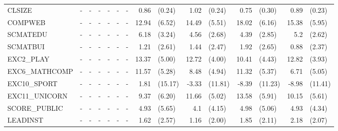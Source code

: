 \documentclass[10pt]{article}
\begin{document}
\begin{table}[htbp]
\begin{tabular}{lrlrlrlrlrlrlrl}
 CLSIZE & \multicolumn{1}{c}{-} & \multicolumn{1}{c}{-} & \multicolumn{1}{c}{-} & \multicolumn{1}{c}{-} & \multicolumn{1}{c}{-} & \multicolumn{1}{c}{-} & 0.86  & (0.24) & 1.02  & (0.24) & 0.75  & (0.30) & 0.89  & (0.23) \\[0.2em]
 COMPWEB & \multicolumn{1}{c}{-} & \multicolumn{1}{c}{-} & \multicolumn{1}{c}{-} & \multicolumn{1}{c}{-} & \multicolumn{1}{c}{-} & \multicolumn{1}{c}{-} & 12.94 & (6.52) & 14.49 & (5.51) & 18.02 & (6.16) & 15.38 & (5.95) \\[0.2em]
 SCMATEDU & \multicolumn{1}{c}{-} & \multicolumn{1}{c}{-} & \multicolumn{1}{c}{-} & \multicolumn{1}{c}{-} & \multicolumn{1}{c}{-} & \multicolumn{1}{c}{-} & 6.18  & (3.24) & 4.56  & (2.68) & 4.39  & (2.85) & 5.2   & (2.62) \\[0.2em]
 SCMATBUI & \multicolumn{1}{c}{-} & \multicolumn{1}{c}{-} & \multicolumn{1}{c}{-} & \multicolumn{1}{c}{-} & \multicolumn{1}{c}{-} & \multicolumn{1}{c}{-} & 1.21  & (2.61) & 1.44  & (2.47) & 1.92  & (2.65) & 0.88  & (2.37) \\[0.2em]
 EXC2\_PLAY & \multicolumn{1}{c}{-} & \multicolumn{1}{c}{-} & \multicolumn{1}{c}{-} & \multicolumn{1}{c}{-} & \multicolumn{1}{c}{-} & \multicolumn{1}{c}{-} & 13.37 & (5.00) & 12.72 & (4.00) & 10.41 & (4.43) & 12.82 & (3.93) \\[0.2em]
 EXC6\_MATHCOMP & \multicolumn{1}{c}{-} & \multicolumn{1}{c}{-} & \multicolumn{1}{c}{-} & \multicolumn{1}{c}{-} & \multicolumn{1}{c}{-} & \multicolumn{1}{c}{-} & 11.57 & (5.28) & 8.48  & (4.94) & 11.32 & (5.37) & 6.71  & (5.05) \\[0.2em]
 EXC10\_SPORT & \multicolumn{1}{c}{-} & \multicolumn{1}{c}{-} & \multicolumn{1}{c}{-} & \multicolumn{1}{c}{-} & \multicolumn{1}{c}{-} & \multicolumn{1}{c}{-} & 1.81  & (15.17) & -3.33 & (11.81) & -8.39 & (11.23) & -8.98 & (11.41) \\[0.2em]
 EXC11\_UNICORN & \multicolumn{1}{c}{-} & \multicolumn{1}{c}{-} & \multicolumn{1}{c}{-} & \multicolumn{1}{c}{-} & \multicolumn{1}{c}{-} & \multicolumn{1}{c}{-} & 9.37  & (6.20) & 11.66 & (5.02) & 13.58 & (5.91) & 10.15 & (5.61) \\[0.2em]
 SCORE\_PUBLIC & \multicolumn{1}{c}{-} & \multicolumn{1}{c}{-} & \multicolumn{1}{c}{-} & \multicolumn{1}{c}{-} & \multicolumn{1}{c}{-} & \multicolumn{1}{c}{-} & 4.93  & (5.65) & 4.1   & (4.15) & 4.98  & (5.06) & 4.93  & (4.34) \\[0.2em]
 LEADINST & \multicolumn{1}{c}{-} & \multicolumn{1}{c}{-} & \multicolumn{1}{c}{-} & \multicolumn{1}{c}{-} & \multicolumn{1}{c}{-} & \multicolumn{1}{c}{-} & 1.62  & (2.57) & 1.16  & (2.00) & 1.85  & (2.11) & 2.18  & (2.07) \\[0.2em]

\end{tabular}
\end{table}
\end{document}
